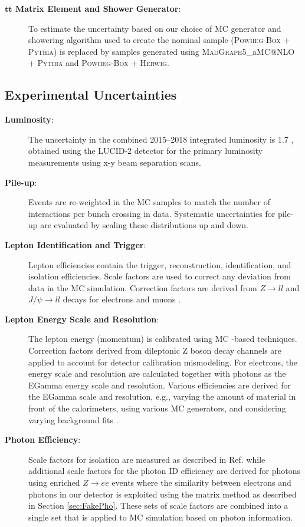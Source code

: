 \begin{description}
\item[\textbf{$\textbf{t}\bar{\textbf{t}}$ Matrix Element and Shower Generator}:]  To estimate the uncertainty based on our choice of MC generator and showering algorithm used to create the nominal sample (\textsc{Powheg-Box + Pythia}) is replaced by samples generated using \textsc{MadGraph5\_}a\textsc{MC@NLO + Pythia} and \textsc{Powheg-Box + Herwig}.
\end{description}

\subsection{Experimental Uncertainties}
\begin{description}
\item[\textbf{Luminosity}:] The uncertainty in the combined 2015--2018 integrated luminosity is 1.7  \cite{ATLAS-CONF-2019-021}, obtained using the LUCID-2 detector \cite{LUCID2} for the primary luminosity measurements using x-y beam separation scans.

\item[\textbf{Pile-up}:]  Events are re-weighted in the MC samples to match the number of interactions per bunch crossing in data.  Systematic uncertainties for pile-up are evaluated by scaling these distributions up and down.

\item[\textbf{Lepton Identification and Trigger}:]   Lepton efficiencies contain the trigger, reconstruction, identification, and isolation efficiencies.  Scale factors are used to correct any deviation from data in the MC simulation.  Correction factors are derived from $Z\rightarrow ll$ and $J/ \psi \rightarrow ll$ decays for electrons \cite{ElectronID} and muons \cite{MuonID}.

\item[\textbf{Lepton Energy Scale and Resolution}:]  The lepton energy (momentum) is calibrated using MC -based techniques.  Correction factors derived from dileptonic Z boson decay channels are applied to account for detector calibration mismodeling.  For electrons, the energy scale and resolution are calculated together with photons as the EGamma energy scale and resolution.  Various efficiencies are derived for the EGamma scale and resolution, e.g., varying the amount of material in front of the calorimeters, using various MC generators, and considering varying background fits \cite{ElectronID, PhotonID}.
\item[\textbf{Photon Efficiency}:]  Scale factors for isolation are measured as described in Ref. \cite{Lesage:2017uzg} while additional scale factors for the photon ID efficiency are derived for photons using enriched $Z\rightarrow ee$ events where the similarity between electrons and photons in our detector is exploited using the matrix method as described in Section \ref{sec:FakePho}. These sets of scale factors are combined into a single set that is applied to MC simulation based on photon information.


\end{description}
